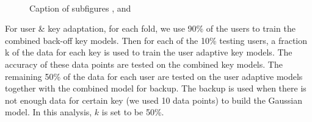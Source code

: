 \documentclass{sigchi}
\begin{document}
\begin{figure}[tb]
	\centering
	 ~
	\caption[Optional caption for list of figures]{Caption of subfigures
	,  and }
	\label{fig:subfigureExample}
\end{figure}

For user & key adaptation, for each fold, we use 90\% of the users to train the
combined back-off key models. Then for each of the 10\% testing users,  a
fraction k of the data for each key is used to train the user adaptive key
models. The accuracy of these data points are tested on the combined key models.
The remaining 50\% of the data for each user are tested on the user adaptive 
models together with the combined model for backup. The backup is used when 
there is not enough data for certain key (we used 10 data points) to build the 
Gaussian model. In this analysis, $k$ is set to be 50\%.
\end{document}
